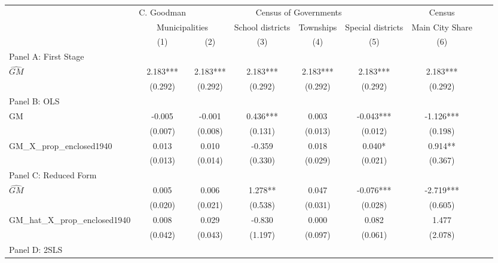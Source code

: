  \begin{tabular}{l*{8}{c}} \toprule
&\multicolumn{1}{c}{C. Goodman}&\multicolumn{4}{c}{Census of Governments}&\multicolumn{1}{c}{Census}\\\cmidrule(lr){2-2}\cmidrule(lr){3-6}\cmidrule(lr){7-7}
&\multicolumn{2}{c}{Municipalities}&\multicolumn{1}{c}{School districts}&\multicolumn{1}{c}{Townships}&\multicolumn{1}{c}{Special districts}&\multicolumn{1}{c}{Main City Share}\\\cmidrule(lr){2-3}\cmidrule(lr){4-6}\cmidrule(lr){7-7}
&\multicolumn{1}{c}{(1)}&\multicolumn{1}{c}{(2)}&\multicolumn{1}{c}{(3)}&\multicolumn{1}{c}{(4)}&\multicolumn{1}{c}{(5)}&\multicolumn{1}{c}{(6)}\\
\cmidrule(lr){1-7}
\multicolumn{6}{l}{Panel A: First Stage}\\
\cmidrule(lr){1-7}
$\widehat{GM}$  &    2.183***&    2.183***&    2.183***&    2.183***&    2.183***&    2.183***\\
                &  (0.292)   &  (0.292)   &  (0.292)   &  (0.292)   &  (0.292)   &  (0.292)   \\
\cmidrule(lr){1-7}
\multicolumn{6}{l}{Panel B: OLS}\\
\cmidrule(lr){1-7}
GM              &   -0.005   &   -0.001   &    0.436***&    0.003   &   -0.043***&   -1.126***\\
                &  (0.007)   &  (0.008)   &  (0.131)   &  (0.013)   &  (0.012)   &  (0.198)   \\
\addlinespace
GM\_X\_prop\_enclosed1940&    0.013   &    0.010   &   -0.359   &    0.018   &    0.040*  &    0.914** \\
                &  (0.013)   &  (0.014)   &  (0.330)   &  (0.029)   &  (0.021)   &  (0.367)   \\
\cmidrule(lr){1-7}
\multicolumn{6}{l}{Panel C: Reduced Form}\\
\cmidrule(lr){1-7}
$\widehat{GM}$  &    0.005   &    0.006   &    1.278** &    0.047   &   -0.076***&   -2.719***\\
                &  (0.020)   &  (0.021)   &  (0.538)   &  (0.031)   &  (0.028)   &  (0.605)   \\
\addlinespace
GM\_hat\_X\_prop\_enclosed1940&    0.008   &    0.029   &   -0.830   &    0.000   &    0.082   &    1.477   \\
                &  (0.042)   &  (0.043)   &  (1.197)   &  (0.097)   &  (0.061)   &  (2.078)   \\
\cmidrule(lr){1-7}
\multicolumn{6}{l}{Panel D: 2SLS}\\

\end{tabular}
